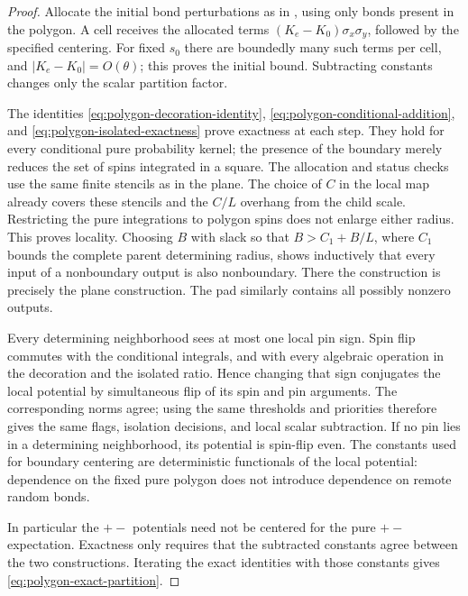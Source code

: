 \begin{proof}
Allocate the initial bond perturbations as in
\cite[Section~``Tuning a trajectory with vanishing perturbations'']{Q},
using only bonds present in the polygon.  A cell receives the allocated
terms $(K_e-K_0)\sigma_x\sigma_y$, followed by the specified centering.
For fixed $s_0$ there are boundedly many such terms per cell, and
$|K_e-K_0|=O(\theta)$; this proves the initial bound.  Subtracting
constants changes only the scalar partition factor.

The identities \eqref{eq:polygon-decoration-identity},
\eqref{eq:polygon-conditional-addition}, and
\eqref{eq:polygon-isolated-exactness} prove exactness at each step.
They hold for every conditional pure probability kernel; the presence
of the boundary merely reduces the set of spins integrated in a
square.  The allocation and status checks use the same finite stencils
as in the plane.  The choice of $C$ in the local map already covers
these stencils and the $C/L$ overhang from the child scale.  Restricting
the pure integrations to polygon spins does not enlarge either radius.
This proves locality.  Choosing
$B$ with slack so that $B>C_1+B/L$, where $C_1$ bounds the complete
parent determining radius, shows inductively that every input of a
nonboundary output is also nonboundary.  There the construction is
precisely the plane construction.  The pad similarly contains all
possibly nonzero outputs.

Every determining neighborhood sees at most one local pin sign.
Spin flip commutes with the conditional integrals, and with every
algebraic operation in the decoration and the isolated ratio.  Hence
changing that sign conjugates the local potential by simultaneous
flip of its spin and pin arguments.  The corresponding norms agree;
using the same thresholds and priorities therefore gives the same
flags, isolation decisions, and local scalar subtraction.  If no pin
lies in a determining neighborhood, its potential is spin-flip even.
The constants used for boundary centering are deterministic
functionals of the local potential: dependence on the fixed pure
polygon does not introduce dependence on remote random bonds.

In particular the $+-$ potentials need not be centered for the pure
$+-$ expectation.  Exactness only requires that the subtracted
constants agree between the two constructions.  Iterating the exact
identities with those constants gives
\eqref{eq:polygon-exact-partition}.
\end{proof}

